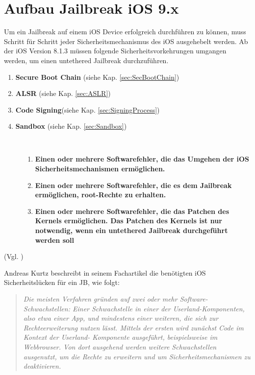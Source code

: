 \section{Aufbau Jailbreak iOS 9.x}
\label{sec:JBAufbau}
Um ein Jailbreak auf einem iOS Device erfolgreich durchführen zu können, muss Schritt für Schritt jeder Sicherheitsmechanismus des iOS ausgehebelt werden. Ab der iOS Version 8.1.3 müssen folgende Sicherheitsvorkehrungen umgangen werden, um einen untethered Jailbreak durchzuführen.

\begin{enumerate}
	    \item \textbf{Secure Boot Chain} (siehe Kap. \ref{sec:SecBootChain})
	    \item \textbf{ALSR }(siehe Kap. \ref{sec:ASLR}) 
	    \item \textbf{Code Signing}(siehe Kap. \ref{sec:SigningProcess}) 	   
	    \item \textbf{Sandbox} (siehe Kap. \ref{sec:Sandbox}) 
\end{enumerate}

\begin{description}
    \item[\parbox{\textwidth} {Damit die Sicherheitsmechanismen überhaupt umgangen werden können, müssen verschiedene Programmierfehler im iOS gefunden werden. }]~\par
  \begin{enumerate}
  \item \textbf{Einen oder mehrere Softwarefehler, die das Umgehen der iOS Sicherheitsmechanismen ermöglichen.}
  \item \textbf{Einen oder mehrere Softwarefehler, die es dem Jailbreak ermöglichen, root-Rechte zu erhalten.}
  \item \textbf{Einen oder mehrere Softwarefehler, die das Patchen des Kernels ermöglichen. Das Patchen des Kernels ist nur notwendig, wenn ein untethered Jailbreak durchgeführt werden soll}
\end{enumerate}\end{description} 
(Vgl. \cite{TaiG[1], TaiG[2], TaiG[3]})

Andreas Kurtz beschreibt in seinem Fachartikel die benötigten iOS Sicherheitslücken für ein JB, wie folgt: 
\begin{quote}
\textit{\glqq Die meisten Verfahren gründen auf zwei oder mehr Software-Schwachstellen: Einer Schwachstelle in einer der Userland-Komponenten, also etwa einer App, und mindestens einer weiteren, die sich zur Rechteerweiterung nutzen lässt. Mittels der ersten wird zunächst Code im Kontext der Userland- Komponente ausgeführt, beispielsweise im Webbrowser. Von dort ausgehend werden weitere Schwachstellen ausgenutzt, um die Rechte zu erweitern und um Sicherheitsmechanismen zu deaktivieren.\grqq{}} \cite{JB[2]} 
\end{quote}

